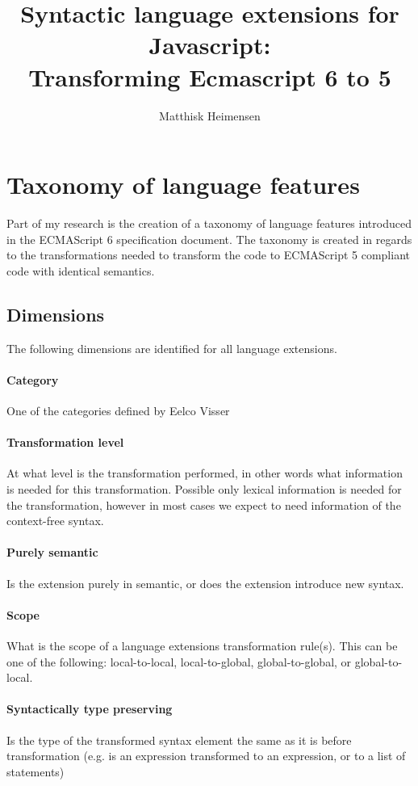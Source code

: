\documentclass[10pt,a4paper]{article}
\title{%
	Syntactic language extensions for Javascript: \\
	\large Transforming Ecmascript 6 to 5}
\author{Matthisk Heimensen}
\begin{document}
	\maketitle
	\tableofcontents
\section{Taxonomy of language features}
Part of my research is the creation of a taxonomy of language features introduced in the ECMAScript 6 specification document. The taxonomy is created in regards to the transformations needed to transform the code to ECMAScript 5 compliant code with identical semantics.

\subsection{Dimensions}
The following dimensions are identified for all language extensions.

\paragraph{Category}
One of the categories defined by Eelco Visser\cite{Visser2003}

\paragraph{Transformation level}
At what level is the transformation performed, in other words what information is needed for this transformation. Possible only lexical information is needed for the transformation, however in most cases we expect to need information of the context-free syntax.

\paragraph{Purely semantic}
Is the extension purely in semantic, or does the extension introduce new syntax.

\paragraph{Scope}
What is the scope of a language extensions transformation rule(s). This can be one of the following: local-to-local, local-to-global, global-to-global, or global-to-local.

\paragraph{Syntactically type preserving}
Is the type of the transformed syntax element the same as it is before transformation (e.g. is an expression transformed to an expression, or to a list of statements)
\end{document}
